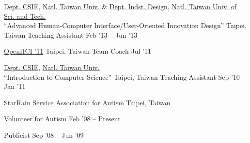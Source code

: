 \documentclass[10pt, a4paper]{article} %
\begin{document}


\headedsection
{
 \href{http://www.csie.ntu.edu.tw}{Dept. CSIE},
 \href{http://www.ntu.edu.tw}{Natl. Taiwan Univ.} \&
 \href{http://www.dt.ntust.edu.tw/}{Dept. Indst. Design},
 \href{http://www.ntust.edu.tw}{Natl. Taiwan Univ. of Sci. and Tech.}\\
 ``Advanced Human-Computer Interface/User-Oriented Innovation Design''
}
{Taipei, Taiwan}{
	\headedsubsection
	{Teaching Assistant}
	{Feb '13 -- Jun '13}
	{
	}
}

\headedsection
{
 \href{http://www.opehci.com/2011/}{OpenHCI '11}
}
{Taipei, Taiwan}{
	\headedsubsection
	{Team Coach}
	{Jul '11}
	{
	}
}

\headedsection
{
 \href{http://www.csie.ntu.edu.tw}{Dept. CSIE},
 \href{http://www.ntu.edu.tw}{Natl. Taiwan Univ.}\\
 ``Introduction to Computer Science''
}
{Taipei, Taiwan}{
	\headedsubsection
	{Teaching Assistant}
	{Sep '10 -- Jan '11}
	{
	}
}


\spacedhrule{1.5em}{-1em} %



\headedsection
{\href{http://goo.gl/2Dmqrj}{StarRain Service Association for Autism}}
{Taipei, Taiwan}{

	\headedsubsection
	{Volunteer for Autism} 
	{Feb '08 -- Present}
	{}

	\headedsubsection
	{Publicist} 
	{Sep '08 -- Jun '09}
	{} 
}
\end{document}
